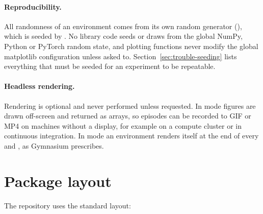 \paragraph{Reproducibility.}
All randomness of an environment comes from its own random generator
(), which is seeded by . No library
code seeds or draws from the global NumPy, Python or PyTorch random state, and
plotting functions never modify the global matplotlib configuration unless
asked to. Section~\ref{sec:trouble-seeding} lists everything that must be
seeded for an experiment to be repeatable.

\paragraph{Headless rendering.}
Rendering is optional and never performed unless requested. In
 mode figures are drawn off-screen and returned as
  arrays, so episodes can be recorded to GIF or MP4
on machines without a display, for example on a compute cluster or in
continuous integration. In  mode an environment renders itself
at the end of every  and , as Gymnasium prescribes.

\section{Package layout}\label{sec:intro-layout}

The repository uses the standard  layout:

